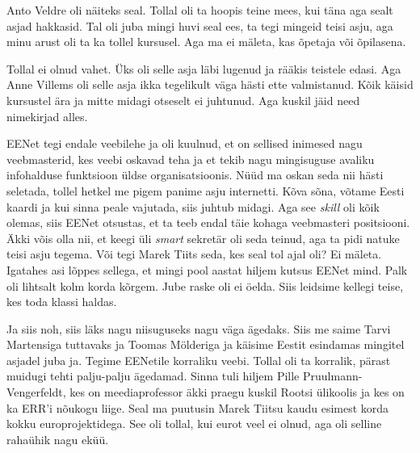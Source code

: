 Anto Veldre oli näiteks seal. Tollal oli ta hoopis 
teine mees, kui täna aga sealt asjad hakkasid. Tal oli juba mingi huvi seal 
ees, ta tegi mingeid teisi asju, aga minu arust oli ta ka tollel kursusel. Aga 
ma ei mäleta, kas õpetaja või õpilasena.


Tollal ei olnud vahet. Üks oli selle asja läbi lugenud ja rääkis teistele 
edasi. Aga Anne Villems oli selle asja ikka 
tegelikult väga hästi ette valmistanud. Kõik käisid kursustel ära ja mitte 
midagi otseselt ei juhtunud. Aga kuskil jäid need nimekirjad alles. 

EENet tegi endale veebilehe ja oli kuulnud, et on sellised 
inimesed nagu veebmasterid, kes veebi oskavad teha ja et tekib nagu mingisuguse 
avaliku infohalduse funktsioon üldse organisatsioonis. Nüüd ma oskan seda nii 
hästi seletada, tollel hetkel me pigem panime asju internetti. Kõva sõna, 
võtame Eesti kaardi ja kui sinna peale vajutada, siis juhtub midagi. Aga see 
\emph{skill} oli kõik olemas, siis EENet otsustas, et ta teeb  endal täie 
kohaga veebmasteri positsiooni. Äkki võis olla nii, et keegi üli \emph{smart} 
sekretär oli seda teinud, aga ta pidi natuke teisi asju tegema. Või tegi Marek 
Tiits seda, kes seal tol ajal oli? Ei mäleta. Igatahes 
asi lõppes sellega, et mingi pool aastat hiljem kutsus EENet mind. Palk oli 
lihtsalt kolm korda kõrgem. Jube raske oli ei öelda. Siis leidsime kellegi 
teise, kes toda klassi haldas. 

Ja siis noh, siis läks nagu niisuguseks nagu väga ägedaks. Siis me saime Tarvi 
Martensiga tuttavaks ja Toomas 
Mölderiga ja käisime Eestit esindamas mingitel 
asjadel juba ja. Tegime EENetile korraliku veebi. Tollal oli ta korralik, 
pärast muidugi tehti palju-palju ägedamad. Sinna tuli hiljem Pille 
Pruulmann-Vengerfeldt, kes on 
meediaprofessor äkki praegu kuskil Rootsi ülikoolis ja kes on ka ERR'i nõukogu 
liige. Seal ma puutusin Marek Tiitsu kaudu esimest 
korda kokku europrojektidega. See oli tollal, kui eurot veel ei olnud, aga oli 
selline rahaühik nagu eküü. 


